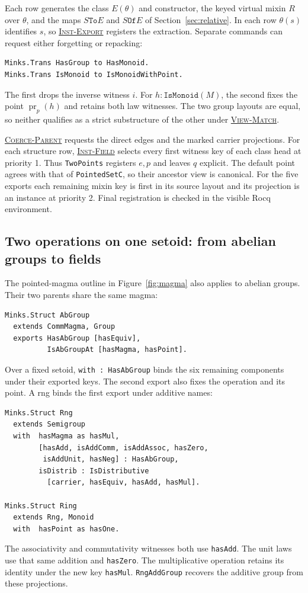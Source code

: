 \documentclass{article}
\newcommand{\ttt}[1]{\texttt{#1}}
\newcommand{\proj}{\operatorname{pr}}
\newcommand{\ruse}[1]{\hyperlink{rule-#1}{\textsc{#1}}}
\begin{document}
Each row generates the class $E(\theta)$ and constructor, the keyed
virtual mixin $R$ over $\theta$, and the maps $S\ttt{To}E$ and
$S\ttt{Of}E$ of Section~\ref{sec:relative}. In each row $\theta(s)$
identifies $s$, so \ruse{Inst-Export} registers the extraction.
Separate commands can request either forgetting or repacking:
\begin{verbatim}
Minks.Trans HasGroup to HasMonoid.
Minks.Trans IsMonoid to IsMonoidWithPoint.
\end{verbatim}
The first drops the inverse witness $i$. For $h:\ttt{IsMonoid}(M)$,
the second fixes the point $\proj_p(h)$ and retains both law witnesses.
The two group layouts are equal, so neither qualifies as a strict
substructure of the other under \ruse{View-Match}.

\ruse{Coerce-Parent} requests the direct edges and the marked carrier
projections. For each structure row, \ruse{Inst-Field} selects every
first witness key of each class head at priority 1. Thus \ttt{TwoPoints}
registers $e,p$ and leaves $q$ explicit. The default point agrees with
that of \ttt{PointedSetC}, so their ancestor view is canonical.
For the five exports each remaining mixin key is first in its source
layout and its projection is an instance at priority 2.
Final registration is checked in the visible Rocq environment.

\subsection{Two operations on one setoid: from abelian groups to fields}
The pointed-magma outline in Figure~\ref{fig:magma} also applies to
abelian groups. Their two parents share the same magma:
\begin{verbatim}
Minks.Struct AbGroup
  extends CommMagma, Group
  exports HasAbGroup [hasEquiv],
          IsAbGroupAt [hasMagma, hasPoint].
\end{verbatim}
Over a fixed setoid, \ttt{with : HasAbGroup} binds the six remaining
components under their exported keys. The second export also fixes the
operation and its point. A rng binds the first export under additive names:
\begin{verbatim}
Minks.Struct Rng
  extends Semigroup
  with  hasMagma as hasMul,
        [hasAdd, isAddComm, isAddAssoc, hasZero,
         isAddUnit, hasNeg] : HasAbGroup,
        isDistrib : IsDistributive
          [carrier, hasEquiv, hasAdd, hasMul].

Minks.Struct Ring
  extends Rng, Monoid
  with  hasPoint as hasOne.
\end{verbatim}
The associativity and commutativity witnesses both use \ttt{hasAdd}.
The unit laws use that same addition and \ttt{hasZero}. The multiplicative
operation retains its identity under the new key \ttt{hasMul}.
\ttt{RngAddGroup} recovers the additive group from these projections.
\end{document}
